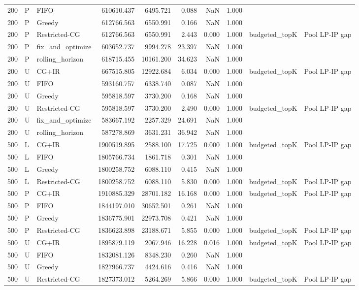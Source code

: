 \begin{tabular}{rllrrrrrll}
200 & P & FIFO & 610610.437 & 6495.721 & 0.088 & NaN & 1.000 &  &  \\
200 & P & Greedy & 612766.563 & 6550.991 & 0.166 & NaN & 1.000 &  &  \\
200 & P & Restricted-CG & 612766.563 & 6550.991 & 2.443 & 0.000 & 1.000 & budgeted_topK & Pool LP-IP gap \\
200 & P & fix_and_optimize & 603652.737 & 9994.278 & 23.397 & NaN & 1.000 &  &  \\
200 & P & rolling_horizon & 618715.455 & 10161.200 & 34.623 & NaN & 1.000 &  &  \\
200 & U & CG+IR & 667515.805 & 12922.684 & 6.034 & 0.000 & 1.000 & budgeted_topK & Pool LP-IP gap \\
200 & U & FIFO & 593160.757 & 6338.740 & 0.087 & NaN & 1.000 &  &  \\
200 & U & Greedy & 595818.597 & 3730.200 & 0.168 & NaN & 1.000 &  &  \\
200 & U & Restricted-CG & 595818.597 & 3730.200 & 2.490 & 0.000 & 1.000 & budgeted_topK & Pool LP-IP gap \\
200 & U & fix_and_optimize & 583667.192 & 2257.329 & 24.691 & NaN & 1.000 &  &  \\
200 & U & rolling_horizon & 587278.869 & 3631.231 & 36.942 & NaN & 1.000 &  &  \\
500 & L & CG+IR & 1900519.895 & 2588.100 & 17.725 & 0.000 & 1.000 & budgeted_topK & Pool LP-IP gap \\
500 & L & FIFO & 1805766.734 & 1861.718 & 0.301 & NaN & 1.000 &  &  \\
500 & L & Greedy & 1800258.752 & 6088.110 & 0.415 & NaN & 1.000 &  &  \\
500 & L & Restricted-CG & 1800258.752 & 6088.110 & 5.830 & 0.000 & 1.000 & budgeted_topK & Pool LP-IP gap \\
500 & P & CG+IR & 1910885.329 & 28701.182 & 16.168 & 0.000 & 1.000 & budgeted_topK & Pool LP-IP gap \\
500 & P & FIFO & 1844197.010 & 30652.501 & 0.261 & NaN & 1.000 &  &  \\
500 & P & Greedy & 1836775.901 & 22973.708 & 0.421 & NaN & 1.000 &  &  \\
500 & P & Restricted-CG & 1836623.898 & 23188.671 & 5.855 & 0.000 & 1.000 & budgeted_topK & Pool LP-IP gap \\
500 & U & CG+IR & 1895879.119 & 2067.946 & 16.228 & 0.016 & 1.000 & budgeted_topK & Pool LP-IP gap \\
500 & U & FIFO & 1832081.126 & 8348.230 & 0.260 & NaN & 1.000 &  &  \\
500 & U & Greedy & 1827966.737 & 4424.616 & 0.416 & NaN & 1.000 &  &  \\
500 & U & Restricted-CG & 1827373.012 & 5264.269 & 5.866 & 0.000 & 1.000 & budgeted_topK & Pool LP-IP gap \\
\bottomrule
\end{tabular}
